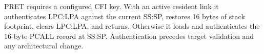 PRET requires a configured CFI key. With an active resident link it authenticates LPC:LPA against the current SS:SP, restores 16 bytes of stack footprint, clears LPC:LPA, and returns. Otherwise it loads and authenticates the 16-byte PCALL record at SS:SP. Authentication precedes target validation and any architectural change.
